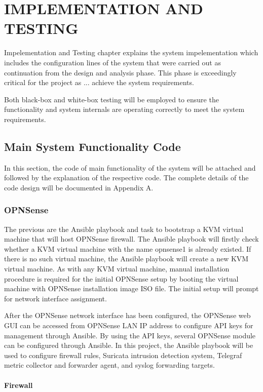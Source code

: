 \documentclass[../index.tex]{subfiles}
\begin{document}
\chapter{IMPLEMENTATION AND TESTING}

Impelementation and Testing chapter explains the system impelementation which includes the
configuration lines of the system that were carried out as continuation from the design and analysis
phase. This phase is exceedingly critical for the project as ... achieve the system requirements.

Both black-box and white-box testing will be employed to ensure the functionality and system
internals are operating correctly to meet the system requirements.

\section{Main System Functionality Code}

In this section, the code of main functionality of the system will be attached and followed by the
explanation of the respective code. The complete details of the code design will be documented in
Appendix A.

\subsection{OPNSense}

The previous are the Ansible playbook and task to bootstrap a KVM virtual machine that will host
OPNSense firewall. The Ansible playbook will firstly check whether a KVM virtual machine with the
name opnsense1 is already existed. If there is no such virtual machine, the Ansible playbook will
create a new KVM virtual machine. As with any KVM virtual machine, manual installation procedure is
required for the initial OPNSense setup by booting the virtual machine with OPNSense installation
image ISO file. The initial setup will prompt for network interface assignment.

After the OPNSense network interface has been configured, the OPNSense web GUI can be accessed from
OPNSense LAN IP address to configure API keys for management through Ansible. By using the API keys,
several OPNSense module can be configured through Ansible. In this project, the Ansible playbook
will be used to configure firewall rules, Suricata intrusion detection system, Telegraf metric
collector and forwarder agent, and syslog forwarding targets. 

\subsubsection{Firewall}
\end{document}

